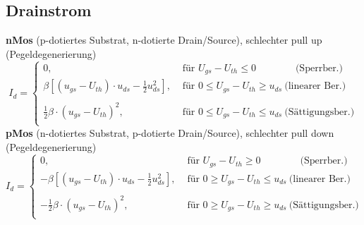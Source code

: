 \documentclass[6pt,a4paper]{scrartcl}
\begin{document}
\begin{multicols*}{3}
	\subsection{Drainstrom}
		\textbf{nMos} (p-dotiertes Substrat, n-dotierte Drain/Source), schlechter pull up (Pegeldegenerierung)
		\begin{equation*}
		\!\!\! I_d = \begin{cases}
		0, &\text{ für }  U_{gs} - U_{th} \le 0 \qquad \qquad  \text{(Sperrber.)}\\[0.2em]
		 \beta [(u_{gs} - U_{th}) \cdot u_{ds} - \frac{1}{2} u_{ds}^2] , &\text{ für }  0 \le U_{gs} - U_{th} \ge u_{ds} \  \text{(linearer Ber.)}\\\\[0.2em]
		 \frac{1}{2} \beta \cdot (u_{gs} - U_{th})^2, &\text{ für }  0 \le U_{gs} - U_{th} \le u_{ds} \  \text{(Sättigungsber.)}\\
		\end{cases}
		\end{equation*}
		\textbf{pMos} (n-dotiertes Substrat, p-dotierte Drain/Source), schlechter pull down (Pegeldegenerierung)
		\begin{equation*}
		\!\!\! I_d = \begin{cases}
		0, &\text{ für }  U_{gs} - U_{th} \ge 0 \qquad \qquad  \text{(Sperrber.)}\\[0.2em]
		- \beta [(u_{gs} - U_{th}) \cdot u_{ds} - \frac{1}{2} u_{ds}^2] , &\text{ für }  0 \ge U_{gs} - U_{th} \le u_{ds} \  \text{(linearer Ber.)}\\\\[0.2em]
		- \frac{1}{2} \beta \cdot (u_{gs} - U_{th})^2, &\text{ für }  0 \ge U_{gs} - U_{th} \ge u_{ds} \  \text{(Sättigungsber.)}\\

		\end{cases}
		\end{equation*}



\end{multicols*}
\end{document}
